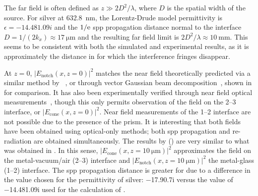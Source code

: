 The far field is often defined as $z\gg 2 D^2/\lambda$, where $D$ is the
spatial width of the source.  For silver at \SI{632.8}{\nano\meter}, the
Lorentz-Drude model permittivity is $\epsilon = \num{-14.48+1.09i}$ and the
$1/{\mathrm{e}}$ \gls{spp} propagation distance normal to the interface $D = 1/(2 k_x)
\approx \SI{17}{\micro\meter}$ and the resulting far field limit is $2
D^2/\lambda \approx \SI{10}{\milli\meter}$.  This seems to be consistent with
both the simulated and experimental results, as it is approximately the
distance in  for which the interference fringes
disappear.

At $z=0$, $|E_\text{notch}(x,z=0)|^2$ matches the near field theoretically
predicted via a similar method by ~\cite{chuang1986lateral}, or
through vector Gaussian beam decomposition~\cite{baida1999theoretical}, shown
in  for comparison.  It has also been experimentally
verified through near field optical measurements~\cite{dawson2001surface},
though this only permits observation of the field on the 2--3 interface, or
$|E_\text{cone}(x,z=0)|^2$.  Near field measurements of the 1--2 interface are
not possible due to the presence of the prism.  It is interesting that both
fields have been obtained using optical-only methods; both \gls{spp} propagation and
re-radiation are obtained simultaneously.  The results by 
() are very similar to what was obtained in
.  In this sense,
$|E_\text{cone}(x,z=\SI{10}{\micro\meter})|^2$ approximates the field on the
metal-vacuum/air (2--3) interface and
$|E_\text{notch}(x,z=\SI{10}{\micro\meter})|^2$ the metal-glass (1--2)
interface.  The \gls{spp} propagation distance is greater for  due to a
difference in the value chosen for the permittivity of silver:
\num{-17.9+0.7i} versus the value of \num{-14.48+1.09i} used for the
calculation of .

